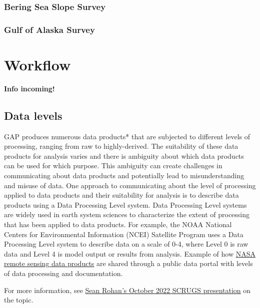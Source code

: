 \documentclass[
  letterpaper,
  oneside,
  open=any]{scrbook}
\begin{document}
\hypertarget{bering-sea-slope-survey}{%
\subsection{Bering Sea Slope Survey}\label{bering-sea-slope-survey}}

\hypertarget{gulf-of-alaska-survey}{%
\subsection{Gulf of Alaska Survey}\label{gulf-of-alaska-survey}}

\hypertarget{workflow}{%
\chapter{Workflow}\label{workflow}}

\textbf{Info incoming!}

\hypertarget{data-levels}{%
\section{Data levels}\label{data-levels}}

GAP produces numerous data products* that are subjected to different
levels of processing, ranging from raw to highly-derived. The
suitability of these data products for analysis varies and there is
ambiguity about which data products can be used for which purpose. This
ambiguity can create challenges in communicating about data products and
potentially lead to misunderstanding and misuse of data. One approach to
communicating about the level of processing applied to data products and
their suitability for analysis is to describe data products using a Data
Processing Level system. Data Processing Level systems are widely used
in earth system sciences to characterize the extent of processing that
has been applied to data products. For example, the NOAA National
Centers for Environmental Information (NCEI) Satellite Program uses a
Data Processing Level system to describe data on a scale of 0-4, where
Level 0 is raw data and Level 4 is model output or results from
analysis. Example of how
\href{https://ladsweb.modaps.eosdis.nasa.gov/search/}{NASA remote
sensing data products} are shared through a public data portal with
levels of data processing and documentation.

For more information, see
\href{https://docs.google.com/presentation/d/1rWSZpeghWJqzWMIa5oBc4BCoy-zy1Yue86RoTw58u6M/edit?usp=sharing}{Sean
Rohan's October 2022 SCRUGS presentation} on the topic.
\end{document}
